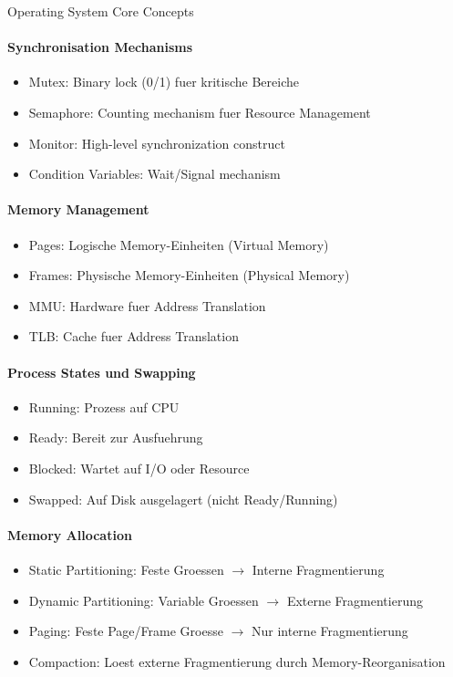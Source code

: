 \begin{KR}{Operating System Core Concepts}
    \paragraph{Synchronisation Mechanisms}
    \begin{itemize}
        \item Mutex: Binary lock (0/1) fuer kritische Bereiche
        \item Semaphore: Counting mechanism fuer Resource Management
        \item Monitor: High-level synchronization construct
        \item Condition Variables: Wait/Signal mechanism
    \end{itemize}
    
    \paragraph{Memory Management}
    \begin{itemize}
        \item Pages: Logische Memory-Einheiten (Virtual Memory)
        \item Frames: Physische Memory-Einheiten (Physical Memory)  
        \item MMU: Hardware fuer Address Translation
        \item TLB: Cache fuer Address Translation
    \end{itemize}
    
    \paragraph{Process States und Swapping}
    \begin{itemize}
        \item Running: Prozess auf CPU
        \item Ready: Bereit zur Ausfuehrung
        \item Blocked: Wartet auf I/O oder Resource
        \item Swapped: Auf Disk ausgelagert (nicht Ready/Running)
    \end{itemize}
    
    \paragraph{Memory Allocation}
    \begin{itemize}
        \item Static Partitioning: Feste Groessen $\rightarrow$ Interne Fragmentierung
        \item Dynamic Partitioning: Variable Groessen $\rightarrow$ Externe Fragmentierung
        \item Paging: Feste Page/Frame Groesse $\rightarrow$ Nur interne Fragmentierung
        \item Compaction: Loest externe Fragmentierung durch Memory-Reorganisation
    \end{itemize}
\end{KR}

